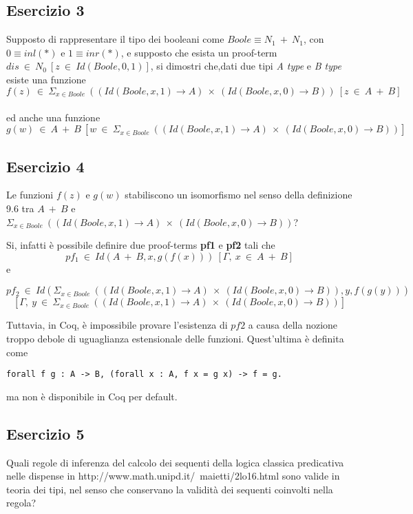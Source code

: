 \subsection{Esercizio 3}
\begin{thm}
	Supposto di rappresentare il tipo dei booleani come $Boole\equiv N_1~+~N_1$, con $0\equiv inl(*)$ e $1\equiv inr(*)$, e supposto che esista un proof-term $dis~\in~N_0~[z~\in~Id(Boole, 0, 1)]$, si dimostri che,dati due tipi \textit{A type} e \textit{B type} esiste una funzione
	\[f(z)~\in~\Sigma_{x\in {Boole}}~((Id(Boole,x,1)\rightarrow A)~\times~(Id(Boole,x,0)\rightarrow B))~[z~\in~A~+~B]\] \\
	ed anche una funzione
	\[g(w)~\in~A~+~B~[w~\in~\Sigma_{x\in {Boole}}~((Id(Boole,x,1)\rightarrow A)~\times~(Id(Boole,x,0)\rightarrow B))]\]
\end{thm}


\subsection{Esercizio 4}
\begin{thm}
	Le funzioni $f(z)$ e $g(w)$ stabiliscono un isomorfismo nel senso della definizione 9.6 tra $A~+~B$ e $\Sigma_{x\in {Boole}}~((Id(Boole,x,1)\rightarrow A)~\times~(Id(Boole,x,0)\rightarrow B))$?
\end{thm}
Si, infatti è possibile definire due proof-terms \textbf{pf1} e \textbf{pf2} tali che \[pf_1~\in~Id(A~+~B, x,g(f(x)))~[\Gamma,~x~\in~A~+~B]\] e 
\begin{scriptsize}
\[pf_2~\in~Id(\Sigma_{x\in {Boole}}~((Id(Boole,x,1)\rightarrow A)~\times~(Id(Boole,x,0)\rightarrow B)), y,f(g(y)))\]
\[[\Gamma,~y~\in~\Sigma_{x\in {Boole}}~((Id(Boole,x,1)\rightarrow A)~\times~(Id(Boole,x,0)\rightarrow B))]\]
\end{scriptsize}

Tuttavia, in Coq, è impossibile provare l'esistenza di $pf2$ a causa della nozione troppo debole di uguaglianza estensionale delle funzioni. Quest'ultima è definita come
\begin{lstlisting}[language=Coq]
	forall f g : A -> B, (forall x : A, f x = g x) -> f = g.
\end{lstlisting}
ma non è disponibile in Coq per default. 

\subsection{Esercizio 5}
\begin{thm}
	Quali regole di inferenza del calcolo dei sequenti della logica classica predicativa nelle dispense in http://www.math.unipd.it/~maietti/2lo16.html sono valide in teoria dei tipi, nel senso che conservano la validità dei sequenti coinvolti nella regola?
\end{thm}



